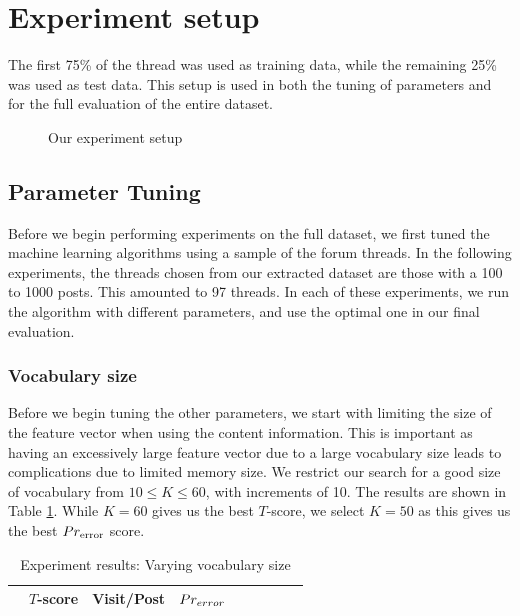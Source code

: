 \section{Experiment setup}
The first 75\% of the thread was used as training data, while the remaining 25\% 
was used as test data. This setup is used in both the tuning of parameters and 
for the full evaluation of the entire dataset.
\begin{figure}
	
	\caption{Our experiment setup}
	\label{fig:exp_setup}
\end{figure}

\subsection{Parameter Tuning}
Before we begin performing experiments on the full dataset, we first tuned the 
machine learning algorithms using a sample of the forum threads. In the 
following experiments, the threads chosen from our extracted dataset are those 
with a 100 to 1000 posts. This amounted to 97 threads. In each of these 
experiments, we run the algorithm with different parameters, and use the optimal 
one in our final evaluation. 

\subsubsection{Vocabulary size}
Before we begin tuning the other parameters, we start with limiting the size of 
the feature vector when using the content information. This is important as 
having an excessively large feature vector due to a large vocabulary size leads 
to complications due to limited memory size. We restrict our search for a good 
size of vocabulary from $10 \leq K \leq 60$, with increments of 10.  The results 
are shown in Table \ref{table:vocab_exp}. While $K=60$ gives us the best 
$T$-score, we select $K=50$ as this gives us the best $Pr_{\text{error}}$ score.  
\begin{table}
	\footnotesize
\begin{center}
	\begin{tabular}{|l|c|c|c|c|c|c|c|c|}
	\hline
& $T$-score			   &	Visit/Post & 	$Pr_{error}$\\
	\hline
	
	\hline
	\end{tabular}
\end{center}
	\caption{Experiment results: Varying vocabulary size}
	\label{table:vocab_exp}
\end{table}




